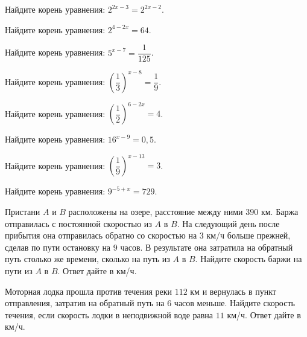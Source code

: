 \begin{class}[number=4]
	\begin{listofex}
		\item Найдите корень уравнения: \( 2^{2x-3}=2^{2x-2} \).
		\item Найдите корень уравнения: \( 2^{4-2x}=64 \).
		\item Найдите корень уравнения: \( 5^{x-7}=\dfrac{ 1 }{ 125 } \).
		\item Найдите корень уравнения: \( \left( \dfrac{ 1 }{ 3 } \right)^{x-8}=\dfrac{ 1 }{ 9 } \).
		\item Найдите корень уравнения: \( \left( \dfrac{ 1 }{ 2 } \right)^{6-2x}=4 \).
		\item Найдите корень уравнения: \( 16^{x-9}=0,5 \).
		\item Найдите корень уравнения: \( \left( \dfrac{ 1 }{ 9 } \right)^{x-13}=3 \).
		\item Найдите корень уравнения: \( 9^{-5+x}=729 \).
		
		
		
		
		\item Пристани \(A\) и \(B\) расположены на озере, расстояние между ними \(390\) км. Баржа отправилась с постоянной скоростью из \(A\) в \(B\). На следующий день после прибытия она отправилась обратно со скоростью на \(3\) км/ч больше прежней, сделав по пути остановку на \(9\) часов. В результате она затратила на обратный путь столько же времени, сколько на путь из \(A\) в \(B\). Найдите скорость баржи на пути из \(A\) в \(B\). Ответ дайте в км/ч.
		\item Моторная лодка прошла против течения реки \(112\) км и вернулась в пункт отправления, затратив на обратный путь на \(6\) часов меньше. Найдите скорость течения, если скорость лодки в неподвижной воде равна \(11\) км/ч. Ответ дайте в км/ч.
		

\end{listofex}
\end{class}
